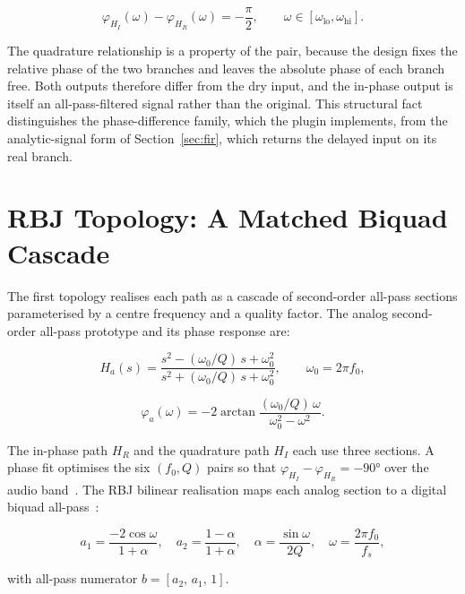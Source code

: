 \documentclass[11pt,a4paper]{article}
\begin{document}
\begin{equation}
\varphi_{H_I}(\omega) - \varphi_{H_R}(\omega) = -\frac{\pi}{2}, \qquad \omega \in [\omega_\text{lo}, \omega_\text{hi}] .
\end{equation}

The quadrature relationship is a property of the pair, because the design fixes the relative phase of the two branches and leaves the absolute phase of each branch free.
Both outputs therefore differ from the dry input, and the in-phase output is itself an all-pass-filtered signal rather than the original.
This structural fact distinguishes the phase-difference family, which the plugin implements, from the analytic-signal form of Section~\ref{sec:fir}, which returns the delayed input on its real branch.

\section{RBJ Topology: A Matched Biquad Cascade}

The first topology realises each path as a cascade of second-order all-pass sections parameterised by a centre frequency and a quality factor.
The analog second-order all-pass prototype and its phase response are:

\begin{equation}
H_a(s) = \frac{s^2 - (\omega_0/Q)\,s + \omega_0^2}{s^2 + (\omega_0/Q)\,s + \omega_0^2},
\qquad \omega_0 = 2\pi f_0 ,
\end{equation}

\begin{equation}
\varphi_a(\omega) = -2\arctan\!\frac{(\omega_0/Q)\,\omega}{\omega_0^2 - \omega^2} .
\end{equation}

The in-phase path $H_R$ and the quadrature path $H_I$ each use three sections.
A phase fit optimises the six $(f_0, Q)$ pairs so that $\varphi_{H_I} - \varphi_{H_R} = -\ang{90}$ over the audio band~\cite{Lang1998Allpass,HarrisBerdahlAbel2010}.
The RBJ bilinear realisation maps each analog section to a digital biquad all-pass~\cite{RBJCookbook}:

\begin{equation}
a_1 = \frac{-2\cos\omega}{1+\alpha},\quad a_2 = \frac{1-\alpha}{1+\alpha},\quad
\alpha = \frac{\sin\omega}{2Q},\quad \omega = \frac{2\pi f_0}{f_s},
\end{equation}

with all-pass numerator $b = [a_2,\, a_1,\, 1]$.
\end{document}
